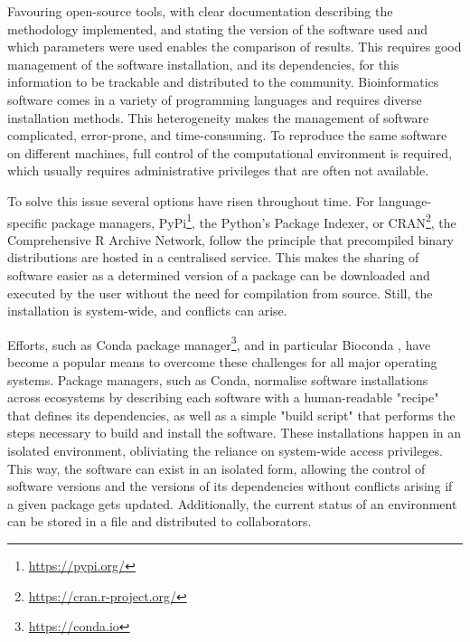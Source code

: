 Favouring open-source tools, with clear documentation describing the methodology implemented, and stating the version of the software used and which parameters were used enables the comparison of results. This requires good management of the software installation, and its dependencies, for this information to be trackable and distributed to the community. Bioinformatics software comes in a variety of programming languages and requires diverse installation methods. This heterogeneity makes the management of software complicated, error-prone, and time-consuming. To reproduce the same software on different machines, full control of the computational environment is required, which usually requires administrative privileges that are often not available.  

To solve this issue several options have risen throughout time. For language-specific package managers, PyPi\footnote{\url{https://pypi.org/}}, the Python's Package Indexer, or CRAN\footnote{\url{https://cran.r-project.org/}}, the Comprehensive R Archive Network, follow the principle that precompiled binary distributions are hosted in a centralised service. This makes the sharing of software easier as a determined version of a package can be downloaded and executed by the user without the need for compilation from source. Still, the installation is system-wide, and conflicts can arise. 

Efforts, such as Conda package manager\footnote{\url{https://conda.io}}, and in particular Bioconda \citep{gruning_bioconda_2018}, have become a popular means to overcome these challenges for all major operating systems. Package managers, such as Conda, normalise software installations across ecosystems by describing each software with a human-readable "recipe" that defines its dependencies, as well as a simple "build script" that performs the steps necessary to build and install the software. These installations happen in an isolated environment, obliviating the reliance on system-wide access privileges. This way, the software can exist in an isolated form, allowing the control of software versions and the versions of its dependencies without conflicts arising if a given package gets updated. Additionally, the current status of an environment can be stored in a file and distributed to collaborators. 

